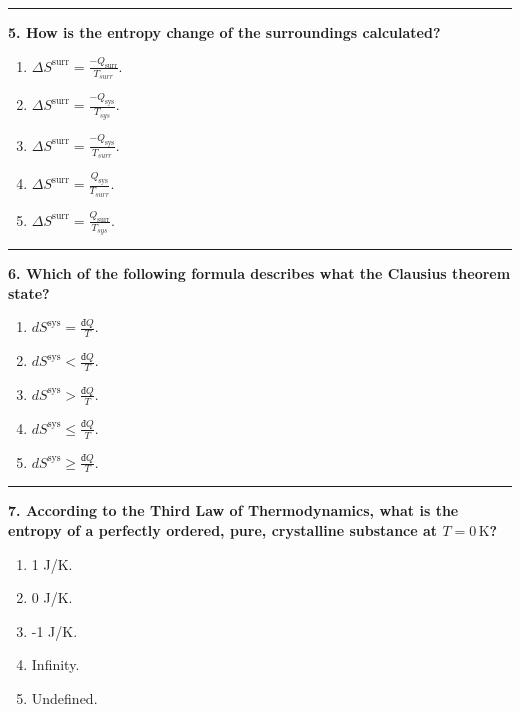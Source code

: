 \documentclass[
  9pt,
]{extbook}
\providecommand{\tightlist}{%
  \setlength{\itemsep}{0pt}\setlength{\parskip}{0pt}}
\theoremstyle{definition}
\theoremstyle{definition}
\theoremstyle{definition}
\theoremstyle{definition}
\theoremstyle{remark}
\begin{document}
\begin{center}\rule{0.5\linewidth}{0.5pt}\end{center}

\textbf{5. How is the entropy change of the surroundings calculated?}

\begin{enumerate}
\def\labelenumi{\alph{enumi}.}
\tightlist
\item
  \(\Delta S^{\text{surr}} = \frac{-Q_{\text{surr}}}{T_{surr}}\).
\item
  \(\Delta S^{\text{surr}} = \frac{-Q_{\text{sys}}}{T_{sys}}\).
\item
  \(\Delta S^{\text{surr}} = \frac{-Q_{\text{sys}}}{T_{surr}}\).
\item
  \(\Delta S^{\text{surr}} = \frac{Q_{\text{sys}}}{T_{surr}}\).
\item
  \(\Delta S^{\text{surr}} = \frac{Q_{\text{surr}}}{T_{sys}}\).
\end{enumerate}

\begin{center}\rule{0.5\linewidth}{0.5pt}\end{center}

\textbf{6. Which of the following formula describes what the Clausius theorem state?}

\begin{enumerate}
\def\labelenumi{\alph{enumi}.}
\tightlist
\item
  \(dS^{\text{sys}} =    \frac{đQ}{T}\).
\item
  \(dS^{\text{sys}} <    \frac{đQ}{T}\).
\item
  \(dS^{\text{sys}} >    \frac{đQ}{T}\).
\item
  \(dS^{\text{sys}} \leq \frac{đQ}{T}\).
\item
  \(dS^{\text{sys}} \geq \frac{đQ}{T}\).
\end{enumerate}

\begin{center}\rule{0.5\linewidth}{0.5pt}\end{center}

\textbf{7. According to the Third Law of Thermodynamics, what is the entropy of a perfectly ordered, pure, crystalline substance at \(T = 0\,\text{K}\)?}

\begin{enumerate}
\def\labelenumi{\alph{enumi}.}
\tightlist
\item
  1 J/K.
\item
  0 J/K.
\item
  -1 J/K.
\item
  Infinity.
\item
  Undefined.
\end{enumerate}
\end{document}
